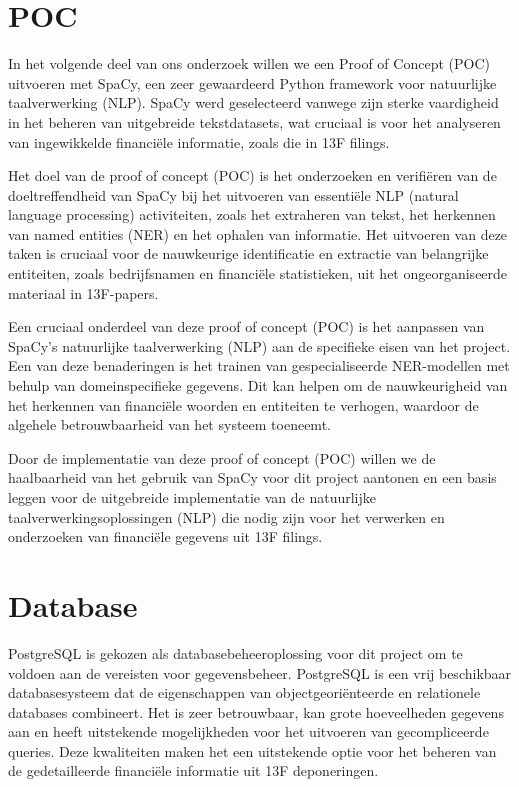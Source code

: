\section{POC}


In het volgende deel van ons onderzoek willen we een Proof of Concept (POC) uitvoeren met SpaCy, een zeer gewaardeerd Python framework voor natuurlijke taalverwerking (NLP). SpaCy werd geselecteerd vanwege zijn sterke vaardigheid in het beheren van uitgebreide tekstdatasets, wat cruciaal is voor het analyseren van ingewikkelde financiële informatie, zoals die in 13F filings.

Het doel van de proof of concept (POC) is het onderzoeken en verifiëren van de doeltreffendheid van SpaCy bij het uitvoeren van essentiële NLP (natural language processing) activiteiten, zoals het extraheren van tekst, het herkennen van named entities (NER) en het ophalen van informatie. Het uitvoeren van deze taken is cruciaal voor de nauwkeurige identificatie en extractie van belangrijke entiteiten, zoals bedrijfsnamen en financiële statistieken, uit het ongeorganiseerde materiaal in 13F-papers.

Een cruciaal onderdeel van deze proof of concept (POC) is het aanpassen van SpaCy's natuurlijke taalverwerking (NLP) aan de specifieke eisen van het project. Een van deze benaderingen is het trainen van gespecialiseerde NER-modellen met behulp van domeinspecifieke gegevens. Dit kan helpen om de nauwkeurigheid van het herkennen van financiële woorden en entiteiten te verhogen, waardoor de algehele betrouwbaarheid van het systeem toeneemt.

Door de implementatie van deze proof of concept (POC) willen we de haalbaarheid van het gebruik van SpaCy voor dit project aantonen en een basis leggen voor de uitgebreide implementatie van de natuurlijke taalverwerkingsoplossingen (NLP) die nodig zijn voor het verwerken en onderzoeken van financiële gegevens uit 13F filings.

\section{Database}
PostgreSQL is gekozen als databasebeheeroplossing voor dit project om te voldoen aan de vereisten voor gegevensbeheer. PostgreSQL is een vrij beschikbaar databasesysteem dat de eigenschappen van objectgeoriënteerde en relationele databases combineert. Het is zeer betrouwbaar, kan grote hoeveelheden gegevens aan en heeft uitstekende mogelijkheden voor het uitvoeren van gecompliceerde queries. Deze kwaliteiten maken het een uitstekende optie voor het beheren van de gedetailleerde financiële informatie uit 13F deponeringen.

